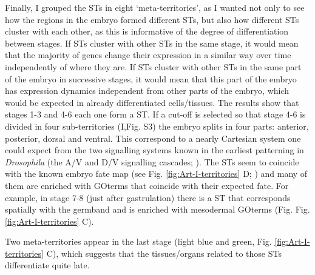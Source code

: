 Finally, I grouped the STs in eight `meta-territories', as I wanted not only to see how the regions in the embryo formed different STs, but also how different STs cluster with each other, as this is informative of the degree of differentiation between stages. If STs cluster with other STs in the same stage, it would mean that the majority of genes change their expression in a similar way over time independently of where they are.
If STs cluster with other STs in the same part of the embryo in successive stages, it would mean that this part of the embryo has expression dynamics independent from other parts of the embryo, which would be expected in already differentiated cells/tissues.
The results show that stages 1-3 and 4-6 each one form a ST. If a cut-off is selected so that stage 4-6 is divided in four sub-territories (I,Fig. S3) the embryo splits in four parts: anterior, posterior, dorsal and ventral.
This correspond to a nearly Cartesian system one could expect from the two signalling systems known in the earliest patterning in \textit{Drosophila} (the A/V and D/V signalling cascades; \citep{Gilbert2014}).
%
The STs seem to coincide with the known embryo fate map (see Fig. \ref{fig:Art-I-territories} D; \citealp{Hartenstein1993}) and many of them are enriched with GOterms that coincide with their expected fate.
For example, in stage 7-8 (just after gastrulation) there is a ST that corresponds spatially with the germband and is enriched with mesodermal GOterms (Fig. Fig. \ref{fig:Art-I-territories} C).

Two meta-territories appear in the last stage (light blue and green, Fig. \ref{fig:Art-I-territories} C), which suggests that the tissues/organs related to those STs differentiate quite late.


